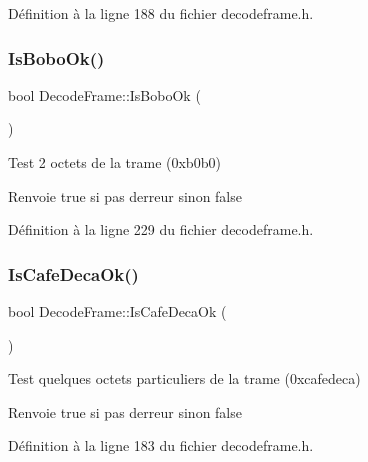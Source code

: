 Définition à la ligne 188 du fichier decodeframe.\+h.

\mbox{\label{class_decode_frame_a0161fec474851adebcb4494c8773242e}} 
\subsubsection{\texorpdfstring{Is\+Bobo\+Ok()}{IsBoboOk()}}
{\footnotesize\ttfamily bool Decode\+Frame\+::\+Is\+Bobo\+Ok (\begin{DoxyParamCaption}{ }\end{DoxyParamCaption})\hspace{0.3cm}{\ttfamily [inline]}}



Test 2 octets de la trame (0xb0b0) 

\begin{DoxyReturn}{Renvoie}
true si pas d\textquotesingle{}erreur sinon false 
\end{DoxyReturn}


Définition à la ligne 229 du fichier decodeframe.\+h.

\mbox{\label{class_decode_frame_a6dfe57ddaf11b02fd88c2edcc98091f3}} 
\subsubsection{\texorpdfstring{Is\+Cafe\+Deca\+Ok()}{IsCafeDecaOk()}}
{\footnotesize\ttfamily bool Decode\+Frame\+::\+Is\+Cafe\+Deca\+Ok (\begin{DoxyParamCaption}{ }\end{DoxyParamCaption})\hspace{0.3cm}{\ttfamily [inline]}}



Test quelques octets particuliers de la trame (0xcafedeca) 

\begin{DoxyReturn}{Renvoie}
true si pas d\textquotesingle{}erreur sinon false 
\end{DoxyReturn}


Définition à la ligne 183 du fichier decodeframe.\+h.

